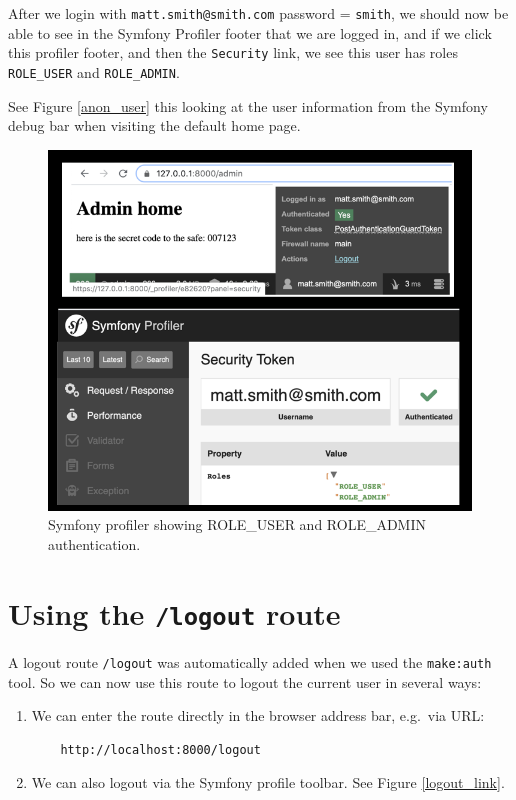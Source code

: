 \documentclass[a4paperpaper,openright]{book}
\begin{document}
After we login with \texttt{matt.smith@smith.com} password =
\texttt{smith}, we should now be able to see in the Symfony Profiler
footer that we are logged in, and if we click this profiler footer, and
then the \texttt{Security} link, we see this user has roles
\texttt{ROLE\_USER} and \texttt{ROLE\_ADMIN}.

See Figure \ref{anon_user} this looking at the user information from the
Symfony debug bar when visiting the default home page.

\begin{figure}
\centering
\includegraphics{./tex2pdf.-40a8cafc9587c9a0/63b5ae9f82867fc51df48c24966ee9fcfd7c738c.png}
\caption{Symfony profiler showing ROLE\_USER and ROLE\_ADMIN
authentication. \label{security01}}
\end{figure}

\hypertarget{using-the-logout-route}{%
\section{\texorpdfstring{Using the \texttt{/logout}
route}{Using the /logout route}}\label{using-the-logout-route}}

A logout route \texttt{/logout} was automatically added when we used the
\texttt{make:auth} tool. So we can now use this route to logout the
current user in several ways:

\begin{enumerate}
\def\labelenumi{\arabic{enumi}.}
\item
  We can enter the route directly in the browser address bar, e.g.~via
  URL:

\begin{verbatim}
    http://localhost:8000/logout
\end{verbatim}
\item
  We can also logout via the Symfony profile toolbar. See Figure
  \ref{logout_link}.
\end{enumerate}
\end{document}
